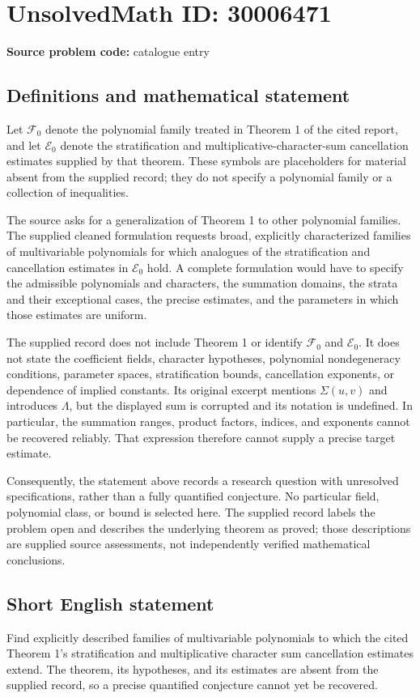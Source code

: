 \documentclass[11pt]{article}
\begin{document}
\section*{UnsolvedMath ID: 30006471}
\textbf{Source problem code:} catalogue entry
\subsection{Definitions and mathematical statement}
Let \(\mathcal F_0\) denote the polynomial family treated in Theorem 1 of the cited report, and let \(\mathcal E_0\) denote the stratification and multiplicative-character-sum cancellation estimates supplied by that theorem. These symbols are placeholders for material absent from the supplied record; they do not specify a polynomial family or a collection of inequalities.

The source asks for a generalization of Theorem 1 to other polynomial families. The supplied cleaned formulation requests broad, explicitly characterized families of multivariable polynomials for which analogues of the stratification and cancellation estimates in \(\mathcal E_0\) hold. A complete formulation would have to specify the admissible polynomials and characters, the summation domains, the strata and their exceptional cases, the precise estimates, and the parameters in which those estimates are uniform.

The supplied record does not include Theorem 1 or identify \(\mathcal F_0\) and \(\mathcal E_0\). It does not state the coefficient fields, character hypotheses, polynomial nondegeneracy conditions, parameter spaces, stratification bounds, cancellation exponents, or dependence of implied constants. Its original excerpt mentions \(\Sigma(u,v)\) and introduces \(\Lambda\), but the displayed sum is corrupted and its notation is undefined. In particular, the summation ranges, product factors, indices, and exponents cannot be recovered reliably. That expression therefore cannot supply a precise target estimate.

Consequently, the statement above records a research question with unresolved specifications, rather than a fully quantified conjecture. No particular field, polynomial class, or bound is selected here. The supplied record labels the problem open and describes the underlying theorem as proved; those descriptions are supplied source assessments, not independently verified mathematical conclusions.
\subsection{Short English statement}
Find explicitly described families of multivariable polynomials to which the cited Theorem 1's stratification and multiplicative character sum cancellation estimates extend. The theorem, its hypotheses, and its estimates are absent from the supplied record, so a precise quantified conjecture cannot yet be recovered.
\end{document}
